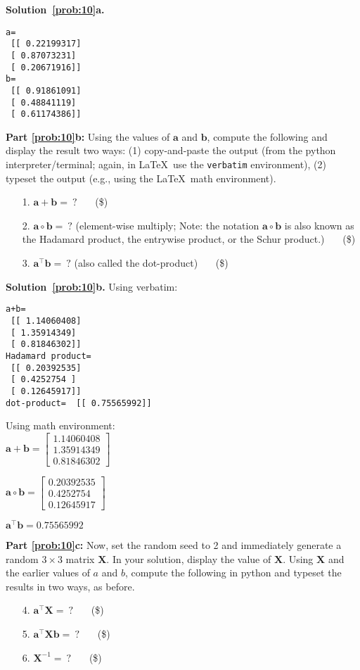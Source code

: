 \documentclass[10pt]{article}
\begin{document}
\begin{enumerate}
{\bf Solution~\ref{prob:10}a.} 

\begin{verbatim}
a= 
 [[ 0.22199317]
 [ 0.87073231]
 [ 0.20671916]]
b= 
 [[ 0.91861091]
 [ 0.48841119]
 [ 0.61174386]]

\end{verbatim}

{\bf Part \ref{prob:10}b:} Using the values of $\mathbf{a}$ and $\mathbf{b}$, compute the following and display the result two ways: (1) copy-and-paste the output (from the python interpreter/terminal; again, in \LaTeX~use the {\tt verbatim} environment), (2) typeset the output (e.g., using the \LaTeX~math environment).
\begin{enumerate}
\item[1.] $\mathbf{a} + \mathbf{b} = ~?$ ~~~(\$)
\item[2.] $\mathbf{a} \circ \mathbf{b} = ~?$  (element-wise multiply; Note: the notation $\mathbf{a} \circ \mathbf{b}$ is also known as the Hadamard product, the entrywise product, or the Schur product.) ~~~(\$)
\item[3.] $\mathbf{a}^\top \mathbf{b} = ~?$  (also called the dot-product) ~~~(\$)
\end{enumerate}

{\bf Solution~\ref{prob:10}b.} 
Using verbatim:
\begin{verbatim}
a+b= 
 [[ 1.14060408]
 [ 1.35914349]
 [ 0.81846302]]
Hadamard product= 
 [[ 0.20392535]
 [ 0.4252754 ]
 [ 0.12645917]]
dot-product=  [[ 0.75565992]]
\end{verbatim}
Using math environment:\\
$\mathbf{a} + \mathbf{b} =
 \begin{bmatrix}
    1.14060408 \\[0.3em]
    1.35914349 \\[0.3em]
    0.81846302
    \end{bmatrix}$
    
$\mathbf{a} \circ \mathbf{b} = 
\begin{bmatrix}
    0.20392535 \\[0.3em]
    0.4252754 \\[0.3em]
    0.12645917
    \end{bmatrix}$   
      
$\mathbf{a}^\top \mathbf{b} = 0.75565992$

{\bf Part \ref{prob:10}c:} Now, set the random seed to 2 and immediately generate a random $3 \times 3$ matrix $\mathbf{X}$.  In your solution, display the value of $\mathbf{X}$.  Using $\mathbf{X}$ and the earlier values of $a$ and $b$, compute the following in python and typeset the results in two ways, as before.
\begin{enumerate}
\item[4.] $\mathbf{a}^\top\mathbf{X} = ~?$ ~~~(\$)
\item[5.] $\mathbf{a}^\top\mathbf{X}\mathbf{b} = ~?$ ~~~(\$)
\item[6.] $\mathbf{X}^{-1} = ~?$ ~~~(\$)
\end{enumerate}


\end{enumerate}
\end{document}
